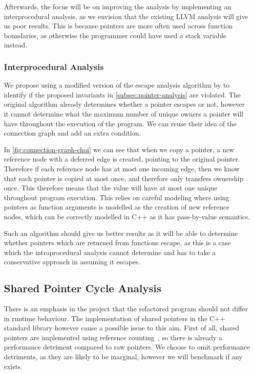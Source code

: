 \documentclass{proposal}
\begin{document}
    Afterwards, the focus will be on improving the analysis by implementing an interprocedural analysis, as we envision that the existing LLVM analysis will give us poor results.
    This is because pointers are more often used across function boundaries, as otherwise the programmer could have used a stack variable instead.

    \subsubsection{Interprocedural Analysis}\label{subsubsec:interprocedural-analysis}

    We propose using a modified version of the escape analysis algorithm by \citet{Choi1999} to identify if the proposed invariants in \autoref{subsec:pointer-analysis} are violated.
    The original algorithm already determines whether a pointer escapes or not, however it cannot determine what the maximum number of unique owners a pointer will have throughout the execution of the program.
    We can reuse their idea of the connection graph and add an extra condition.

    In \autoref{fig:connection-graph-choi} we can see that when we copy a pointer, a new reference node with a deferred edge is created, pointing to the original pointer.
    Therefore if each reference node has at most one incoming edge, then we know that each pointer is copied at most once, and therefore only transfers ownership once.
    This therefore means that the value will have at most one unique throughout program execution.
    This relies on careful modeling where using pointers as function arguments is modelled as the creation of new reference nodes, which can be correctly modelled in C++ as it has pass-by-value semantics.

    Such an algorithm should give us better results as it will be able to determine whether pointers which are returned from functions escape, as this is a case which the intraprocedural analysis cannot determine and has to take a conservative approach in assuming it escapes.

    \subsection{Shared Pointer Cycle Analysis}\label{subsec:shared-pointer-cycle-analysis}

    There is an emphasis in the project that the refactored program should not differ in runtime behaviour.
    The implementation of shared pointers in the C++ standard library however cause a possible issue to this aim.
    First of all, shared pointers are implemented using reference counting~\cite{Collins1960}, so there is already a performance detriment compared to raw pointers.
    We choose to omit performance detriments, as they are likely to be marginal, however we will benchmark if any exists.
\end{document}
